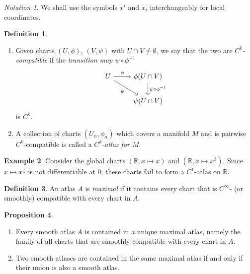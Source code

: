 \documentclass[10pt,letterpaper,cm]{nupset}
\theoremstyle{definition}
\newtheorem{definition}{Definition}[subsection]
\newtheorem{exmp}[definition]{Example}
\theoremstyle{theorem}
\newtheorem{prop}[definition]{Proposition}
\theoremstyle{remark}
\newtheorem*{notation}{Notation}
\newcommand{\R}{\mathbb R}
\newcommand{\1}{\mathbf{1}}
\newcommand{\0}{\vec 0}
\begin{document}
\begin{notation}
We shall use the symbols $x^i$ and $x_i$ interchangeably for local coordinates. 
\end{notation}


\begin{definition} $ $
\begin{enumerate}
\item 
Given charts $(U, \phi)$, $(V, \psi)$ with $U \cap V \ne \emptyset$, we say that the two are \textit{$C^k$-compatible} if the \textit{transition map $\psi \circ \phi^{-1}$}
 \[
  \begin{tikzcd}
    U \arrow{r}{\phi} \arrow[swap]{dr}{\psi} & \phi(U\cap V) \arrow{d}{\psi \circ \phi^{-1}} \\
     & \psi(U \cap V)
  \end{tikzcd}
\]
is $C^k$.
\item A collection of charts $\left(U_\alpha, \phi_\alpha\right)$ which covers a manifold $M$ and is pairwise $C^k$-compatible is called a \textit{$C^k$-atlas for $M$}.
\end{enumerate}
\end{definition}

\begin{exmp}
Consider the global charts $\left(\R, x \mapsto x\right)$ and $\left(\R, x \mapsto x^3\right)$. Since $x \mapsto x^{\frac{1}{3}}$ is not differentiable at $0$, these charts fail to form a $C^1$-atlas on $\R$.
\end{exmp}


\begin{definition}{An atlas $A$ is \textit{maximal} if it contains every chart that is $C^{\infty}$- (or smoothly) compatible with every chart in $A$.}
\end{definition}

\begin{prop}\label{l1} $ $


\begin{enumerate}
\item Every smooth atlas $A$ is contained in a unique maximal atlas, namely the family of all charts that are smoothly compatible with every chart in $A$.
\item Two smooth atlases are contained in the same maximal atlas  if and only if their union is also a smooth atlas.
\end{enumerate}

\end{prop}
\end{document}
